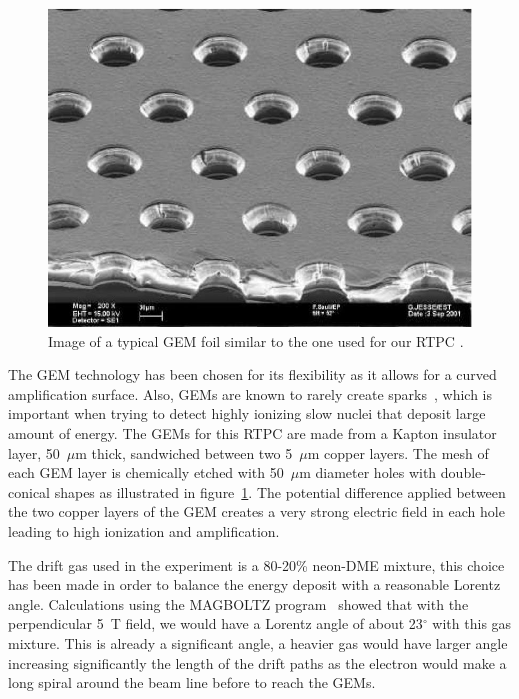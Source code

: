 \documentclass[twocolumn,showpacs,superscriptaddress,groupedaddress]{revtex4}
\begin{document}
\begin{figure}[tbp]
\centering
\includegraphics[scale=0.70]{fig/GEM_photo.jpg}
\caption{Image of a typical GEM foil similar to the one used for our RTPC 
\cite{GEM_ref_pic}.} 
   
   
   \label{fig:GEMs}
\end{figure}

The GEM technology has been chosen for its flexibility as it
allows for a curved amplification surface. Also, GEMs are known to rarely create 
sparks~\cite{GEM_ref}, which is important when trying to detect 
highly ionizing slow nuclei that deposit large amount of energy. The GEMs for 
this RTPC are made from a Kapton insulator layer, 50~$\mu$m 
thick, sandwiched between two 5~$\mu$m copper layers. The mesh of each GEM 
layer is chemically etched with 50~$\mu$m diameter holes with double-conical 
shapes as illustrated in figure~\ref{fig:GEMs}. The potential difference 
applied between the two copper layers of the GEM creates a very strong 
electric field in each hole leading to high ionization and amplification. 

The drift gas used in the experiment is a 80-20\% neon-DME mixture, this choice 
has been made in order to balance the energy deposit with a reasonable
Lorentz angle. Calculations using the MAGBOLTZ program~\cite{MAGBOLTZ} 
showed that with the perpendicular 5~T field, we would have a Lorentz angle of 
about 23$^\circ$ with this gas mixture. This is already a significant angle,
a heavier gas would have larger angle increasing significantly
the length of the drift paths as the electron would 
make a long spiral around the beam line before to reach the GEMs. 
\end{document}

